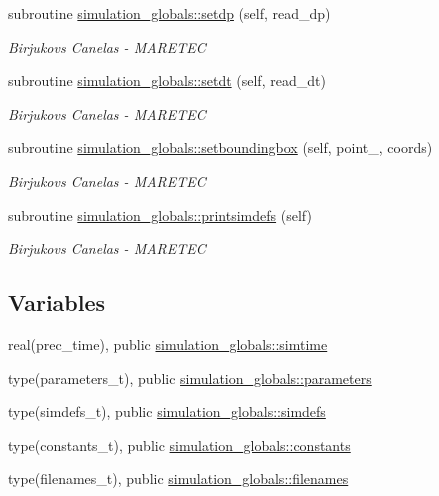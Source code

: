 \begin{DoxyCompactItemize}
subroutine \mbox{\hyperlink{namespacesimulation__globals_a9a8e88c06937b7cf6be9d9bf30f54ba9}{simulation\+\_\+globals\+::setdp}} (self, read\+\_\+dp)
\begin{DoxyCompactList}\small\item\em Birjukovs Canelas -\/ M\+A\+R\+E\+T\+EC \end{DoxyCompactList}\item 
subroutine \mbox{\hyperlink{namespacesimulation__globals_a3ef0462db5a60ac79304cabd2fdd914d}{simulation\+\_\+globals\+::setdt}} (self, read\+\_\+dt)
\begin{DoxyCompactList}\small\item\em Birjukovs Canelas -\/ M\+A\+R\+E\+T\+EC \end{DoxyCompactList}\item 
subroutine \mbox{\hyperlink{namespacesimulation__globals_a1fc4653684d73efecdbd140b6cafe541}{simulation\+\_\+globals\+::setboundingbox}} (self, point\+\_\+, coords)
\begin{DoxyCompactList}\small\item\em Birjukovs Canelas -\/ M\+A\+R\+E\+T\+EC \end{DoxyCompactList}\item 
subroutine \mbox{\hyperlink{namespacesimulation__globals_ad90d6959da1d43e2cd1febff82187ed5}{simulation\+\_\+globals\+::printsimdefs}} (self)
\begin{DoxyCompactList}\small\item\em Birjukovs Canelas -\/ M\+A\+R\+E\+T\+EC \end{DoxyCompactList}\end{DoxyCompactItemize}
\subsection*{Variables}
\begin{DoxyCompactItemize}
\item 
real(prec\+\_\+time), public \mbox{\hyperlink{namespacesimulation__globals_a10daac198c63b06f99ec0c01b614a352}{simulation\+\_\+globals\+::simtime}}
\item 
type(parameters\+\_\+t), public \mbox{\hyperlink{namespacesimulation__globals_ac23e87cbb2256792d683ab1bf5dc5e21}{simulation\+\_\+globals\+::parameters}}
\item 
type(simdefs\+\_\+t), public \mbox{\hyperlink{namespacesimulation__globals_ae851f977b442737307cd4bb76f2f68be}{simulation\+\_\+globals\+::simdefs}}
\item 
type(constants\+\_\+t), public \mbox{\hyperlink{namespacesimulation__globals_aa3e1a54abbb08d2c09978a3509ec4303}{simulation\+\_\+globals\+::constants}}
\item 
type(filenames\+\_\+t), public \mbox{\hyperlink{namespacesimulation__globals_ada5ae97821ffcb77674c3470431101e3}{simulation\+\_\+globals\+::filenames}}
\end{DoxyCompactItemize}
